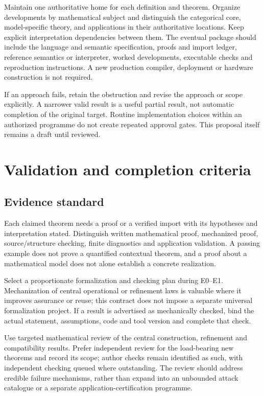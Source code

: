 \documentclass[11pt,a4paper]{article}
\begin{document}
Maintain one authoritative home for each definition and theorem. Organize developments by mathematical subject and distinguish the categorical core, model-specific theory, and applications in their authoritative locations. Keep explicit interpretation dependencies between them. The eventual package should include the language and semantic specification, proofs and import ledger, reference semantics or interpreter, worked developments, executable checks and reproduction instructions. A new production compiler, deployment or hardware construction is not required.

If an approach fails, retain the obstruction and revise the approach or scope explicitly. A narrower valid result is a useful partial result, not automatic completion of the original target. Routine implementation choices within an authorized programme do not create repeated approval gates. This proposal itself remains a draft until reviewed.

\section{Validation and completion criteria}\label{sec:completion}

\subsection{Evidence standard}
Each claimed theorem needs a proof or a verified import with its hypotheses and interpretation stated. Distinguish written mathematical proof, mechanized proof, source/structure checking, finite diagnostics and application validation. A passing example does not prove a quantified contextual theorem, and a proof about a mathematical model does not alone establish a concrete realization.

Select a proportionate formalization and checking plan during E0--E1. Mechanization of central operational or refinement laws is valuable where it improves assurance or reuse; this contract does not impose a separate universal formalization project. If a result is advertised as mechanically checked, bind the actual statement, assumptions, code and tool version and complete that check.

Use targeted mathematical review of the central construction, refinement and compatibility results. Prefer independent review for the load-bearing new theorems and record its scope; author checks remain identified as such, with independent checking queued where outstanding. The review should address credible failure mechanisms, rather than expand into an unbounded attack catalogue or a separate application-certification programme.
\end{document}
